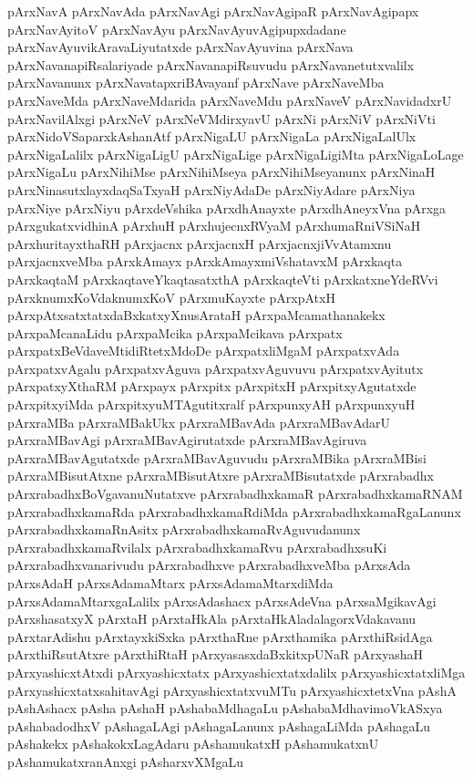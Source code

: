 {pArxNavA
pArxNavAda
pArxNavAgi
pArxNavAgipaR
pArxNavAgipapx
pArxNavAyitoV
pArxNavAyu
pArxNavAyuvAgipupxdadane
pArxNavAyuvikAravaLiyutatxde
pArxNavAyuvina
pArxNava
pArxNavanapiRsalariyade
pArxNavanapiRsuvudu
pArxNavanetutxvalilx
pArxNavanunx
pArxNavatapxriBAvayanf
pArxNave
pArxNaveMba
pArxNaveMda
pArxNaveMdarida
pArxNaveMdu
pArxNaveV
pArxNavidadxrU
pArxNavilAlxgi
pArxNeV
pArxNeVMdirxyavU
pArxNi
pArxNiV
pArxNiVti
pArxNidoVSaparxkAshanAtf
pArxNigaLU
pArxNigaLa
pArxNigaLalUlx
pArxNigaLalilx
pArxNigaLigU
pArxNigaLige
pArxNigaLigiMta
pArxNigaLoLage
pArxNigaLu
pArxNihiMse
pArxNihiMseya
pArxNihiMseyanunx
pArxNinaH
pArxNinasutxlayxdaqSaTxyaH
pArxNiyAdaDe
pArxNiyAdare
pArxNiya
pArxNiye
pArxNiyu
pArxdeVshika
pArxdhAnayxte
pArxdhAneyxVna
pArxga
pArxgukatxvidhinA
pArxhuH
pArxhujecnxRVyaM
pArxhumaRniVSiNaH
pArxhuritayxthaRH
pArxjacnx
pArxjacnxH
pArxjacnxjiVvAtamxnu
pArxjacnxveMba
pArxkAmayx
pArxkAmayxmiVshatavxM
pArxkaqta
pArxkaqtaM
pArxkaqtaveYkaqtasatxthA
pArxkaqteVti
pArxkatxneYdeRVvi
pArxknumxKoVdaknumxKoV
pArxmuKayxte
pArxpAtxH
pArxpAtxsatxtatxdaBxkatxyXnusArataH
pArxpaMcamathanakekx
pArxpaMcanaLidu
pArxpaMcika
pArxpaMcikava
pArxpatx
pArxpatxBeVdaveMtidiRtetxMdoDe
pArxpatxliMgaM
pArxpatxvAda
pArxpatxvAgalu
pArxpatxvAguva
pArxpatxvAguvuvu
pArxpatxvAyitutx
pArxpatxyXthaRM
pArxpayx
pArxpitx
pArxpitxH
pArxpitxyAgutatxde
pArxpitxyiMda
pArxpitxyuMTAgutitxralf
pArxpunxyAH
pArxpunxyuH
pArxraMBa
pArxraMBakUkx
pArxraMBavAda
pArxraMBavAdarU
pArxraMBavAgi
pArxraMBavAgirutatxde
pArxraMBavAgiruva
pArxraMBavAgutatxde
pArxraMBavAguvudu
pArxraMBika
pArxraMBisi
pArxraMBisutAtxne
pArxraMBisutAtxre
pArxraMBisutatxde
pArxrabadhx
pArxrabadhxBoVgavanuNutatxve
pArxrabadhxkamaR
pArxrabadhxkamaRNAM
pArxrabadhxkamaRda
pArxrabadhxkamaRdiMda
pArxrabadhxkamaRgaLanunx
pArxrabadhxkamaRnAsitx
pArxrabadhxkamaRvAguvudanunx
pArxrabadhxkamaRvilalx
pArxrabadhxkamaRvu
pArxrabadhxsuKi
pArxrabadhxvanarivudu
pArxrabadhxve
pArxrabadhxveMba
pArxsAda
pArxsAdaH
pArxsAdamaMtarx
pArxsAdamaMtarxdiMda
pArxsAdamaMtarxgaLalilx
pArxsAdashacx
pArxsAdeVna
pArxsaMgikavAgi
pArxshasatxyX
pArxtaH
pArxtaHkAla
pArxtaHkAladalagorxVdakavanu
pArxtarAdishu
pArxtayxkiSxka
pArxthaRne
pArxthamika
pArxthiRsidAga
pArxthiRsutAtxre
pArxthiRtaH
pArxyasasxdaBxkitxpUNaR
pArxyashaH
pArxyashicxtAtxdi
pArxyashicxtatx
pArxyashicxtatxdalilx
pArxyashicxtatxliMga
pArxyashicxtatxsahitavAgi
pArxyashicxtatxvuMTu
pArxyashicxtetxVna
pAshA
pAshAshacx
pAsha
pAshaH
pAshabaMdhagaLu
pAshabaMdhavimoVkASxya
pAshabadodhxV
pAshagaLAgi
pAshagaLanunx
pAshagaLiMda
pAshagaLu
pAshakekx
pAshakokxLagAdaru
pAshamukatxH
pAshamukatxnU
pAshamukatxranAnxgi
pAsharxvXMgaLu
}
